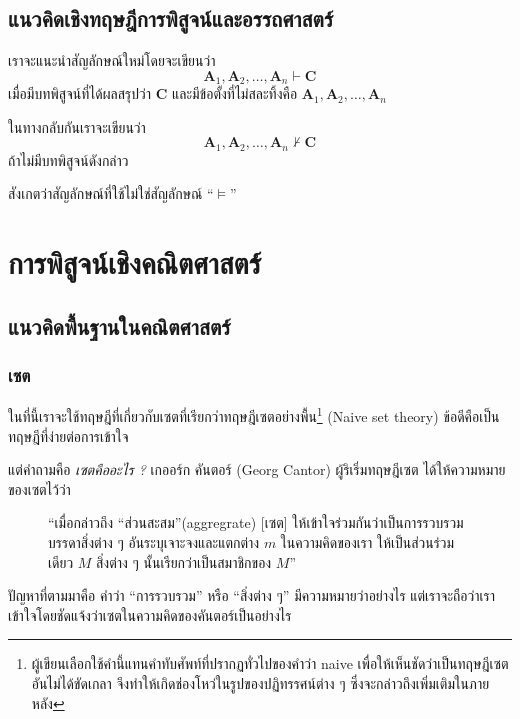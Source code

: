 \documentclass[a4paper,12pt]{extbook}
\theoremstyle{definition}
\theoremstyle{remark}
\begin{document}
	\chapter{แนวคิดเชิงทฤษฎีการพิสูจน์และอรรถศาสตร์}
	เราจะแนะนำสัญลักษณ์ใหม่โดยจะเขียนว่า
	\begin{equation*}
		\mathbf{A}_1, \mathbf{A}_2, \ldots, \mathbf{A}_n \vdash \mathbf{C}
	\end{equation*}
	เมื่อมีบทพิสูจน์ที่ได้ผลสรุปว่า $\mathbf{C}$ และมีข้อตั้งที่ไม่สละทิ้งคือ $\mathbf{A}_1, \mathbf{A}_2, \ldots, \mathbf{A}_n$ 
	
	ในทางกลับกันเราจะเขียนว่า
	\begin{equation*}
	\mathbf{A}_1, \mathbf{A}_2, \ldots, \mathbf{A}_n \nvdash \mathbf{C}
	\end{equation*}
	ถ้าไม่มีบทพิสูจน์ดังกล่าว
	
	สังเกตว่าสัญลักษณ์ที่ใช้ไม่ใช่สัญลักษณ์ ``$\vDash$''
	\part{การพิสูจน์เชิงคณิตศาสตร์}
		\chapter{แนวคิดพื้นฐานในคณิตศาสตร์}
		\section{เซต}
		ในที่นี้เราจะใช้ทฤษฎีที่เกี่ยวกับเซตที่เรียกว่าทฤษฎีเซตอย่างพื้น\footnote{ผู้เขียนเลือกใช้คำนี้แทนคำทับศัพท์ที่ปรากฏทั่วไปของคำว่า naive เพื่อให้เห็นชัดว่าเป็นทฤษฎีเซตอันไม่ได้ขัดเกลา จึงทำให้เกิดช่องโหว่ในรูปของปฏิทรรศน์ต่าง ๆ ซึ่งจะกล่าวถึงเพิ่มเติมในภายหลัง} (Naive set theory) ข้อดีคือเป็นทฤษฎีที่ง่ายต่อการเข้าใจ
		
		แต่คำถามคือ \textit{เซตคืออะไร ?} เกออร์ก คันตอร์ (Georg Cantor) ผู้ริเริ่มทฤษฎีเซต ได้ให้ความหมายของเซตไว้ว่า
		
		\begin{figure}[h]
			``เมื่อกล่าวถึง ``ส่วนสะสม''(aggregrate) [เซต] ให้เข้าใจร่วมกันว่าเป็นการรวบรวมบรรดาสิ่งต่าง ๆ อันระบุเจาะจงและแตกต่าง $m$ ในความคิดของเรา ให้เป็นส่วนร่วมเดียว $M$ สิ่งต่าง ๆ นั้นเรียกว่าเป็นสมาชิกของ $M$''
		\end{figure}
		
		
		ปัญหาที่ตามมาคือ คำว่า ``การรวบรวม'' หรือ ``สิ่งต่าง ๆ'' มีความหมายว่าอย่างไร แต่เราจะถือว่าเราเข้าใจโดยชัดแจ้งว่าเซตในความคิดของคันตอร์เป็นอย่างไร
		
\end{document}
